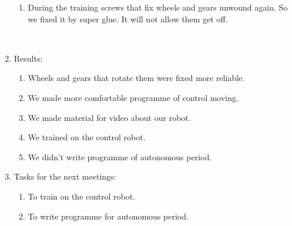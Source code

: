 \begin{enumerate}
\begin{enumerate}
        \item During the training screws that fix wheels and gears unwound again. So we fixed it by super glue. It will not allow them get off.
        \begin{figure}[H]
        	\begin{minipage}[h]{0.2\linewidth}
        		\center  
        	\end{minipage}
        	\begin{minipage}[h]{0.6\linewidth}
        		\caption{}
        	\end{minipage}
        \end{figure}
        
	\end{enumerate}
	
	\item Results:
	\begin{enumerate}
		
		\item Wheels and gears that rotate them were fixed more reliable.
		
		\item We made more comfortable programme of control moving.
		
        \item We made material for video about our robot.
        
        \item We trained on the control robot.
        
        \item We didn't write programme of autonomous period. 
		
	\end{enumerate}
	
	\item Tasks for the next meetings:
	\begin{enumerate}
		
		\item To train on the control robot.
		
		\item To write programme for autonomous period.
			
	\end{enumerate}
\end{enumerate}
\fillpage
